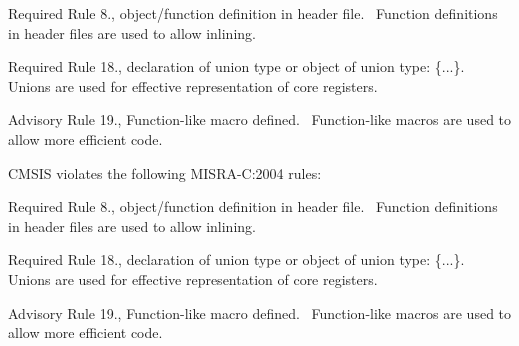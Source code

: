 \begin{DoxyItemize}
\item Required Rule 8., object/function definition in header file.~\newline
 Function definitions in header files are used to allow \textquotesingle{}inlining\textquotesingle{}.\end{DoxyItemize}
\begin{DoxyItemize}
\item Required Rule 18., declaration of union type or object of union type\+: \textquotesingle{}\{...\}\textquotesingle{}.~\newline
 Unions are used for effective representation of core registers.\end{DoxyItemize}
\begin{DoxyItemize}
\item Advisory Rule 19., Function-\/like macro defined.~\newline
 Function-\/like macros are used to allow more efficient code.\end{DoxyItemize}


CMSIS violates the following MISRA-\/C\+:2004 rules\+:

\begin{DoxyItemize}
\item Required Rule 8., object/function definition in header file.~\newline
 Function definitions in header files are used to allow \textquotesingle{}inlining\textquotesingle{}.\end{DoxyItemize}
\begin{DoxyItemize}
\item Required Rule 18., declaration of union type or object of union type\+: \textquotesingle{}\{...\}\textquotesingle{}.~\newline
 Unions are used for effective representation of core registers.\end{DoxyItemize}
\begin{DoxyItemize}
\item Advisory Rule 19., Function-\/like macro defined.~\newline
 Function-\/like macros are used to allow more efficient code. \end{DoxyItemize}
